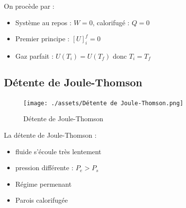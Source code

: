 On procède par :
\begin{itemize}
    \item Système au repos : $W = 0$, calorifugé : $Q = 0$
    \item Premier principe : $[U] _i ^{f}= 0$ 
    \item Gaz parfait : $U(T_i) = U(T_f)$ donc $T_i = T_f$ 


\end{itemize}

\subsection{Détente de Joule-Thomson} %
\label{sub:Détente de Joule-Thomson}

\begin{figure}[H] %
  \centering
  \texttt{[image: ./assets/Détente de Joule-Thomson.png]}
  \caption{Détente de Joule-Thomson}
  \label{fig:Détente de Joule-Thomson}
\end{figure}

La détente de Joule-Thomson : 
\begin{itemize}

    \item fluide s'écoule très lentement 
    \item pression différente : $P_e > P_s$
    \item Régime permenant
    \item Parois calorifugée

\end{itemize}

